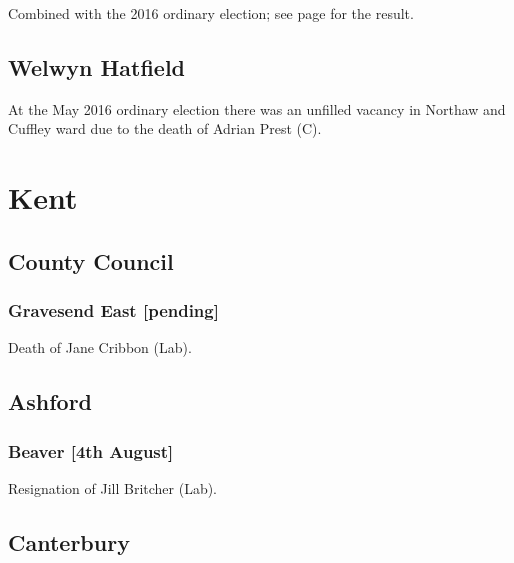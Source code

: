 \documentclass[a4paper,openany]{book}
\begin{document}
\begin{resultsiii}
Combined with the 2016 ordinary election; see page \pageref{SouthOxheyThreeRivers} for the result.

\subsection*{Welwyn Hatfield}

At the May 2016 ordinary election there was an unfilled vacancy in Northaw and Cuffley ward due to the death of Adrian Prest (C).

\section{Kent}

\subsection*{County Council}

\subsubsection*{Gravesend East \hspace*{\fill}\nolinebreak[1]%
\enspace\hspace*{\fill}
[pending]}


Death of Jane Cribbon (Lab).

\subsection*{Ashford}

\subsubsection*{Beaver \hspace*{\fill}\nolinebreak[1]%
\enspace\hspace*{\fill}
[4th August]}


Resignation of Jill Britcher (Lab).

\subsection*{Canterbury}


\end{resultsiii}
\end{document}
